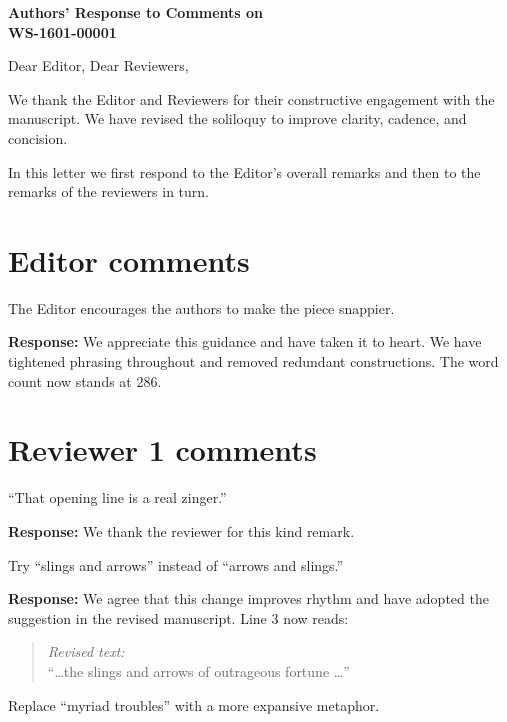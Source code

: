\documentclass[a4paper,fleqn,10pt]{article}
\newcommand{\revcom}[1]{
  \vspace{2mm}\hspace{2mm} \begin{minipage}[t]{0.96\linewidth}
    \vspace{-6mm}\begin{shaded}
      \begin{minipage}{1.0\linewidth}
        #1
      \end{minipage}
    \end{shaded}
  \end{minipage}}
\newcommand{\response}[1]{\vspace{2mm}\textbf{Response:} #1
\vspace{1mm}}
\begin{document}
\begin{center}
	\Large\bf Authors' Response to Comments on \\
	WS-1601-00001
\end{center}

Dear Editor, Dear Reviewers,

\vspace{1em}

We thank the Editor and Reviewers for their constructive engagement with the manuscript. We have revised the soliloquy
to improve clarity, cadence, and concision. 

In this letter we first respond to the Editor's overall remarks and then to the remarks of the reviewers in turn.

\section*{Editor comments}

\revcom{The Editor encourages the authors to make the piece snappier.}

\response{
	We appreciate this guidance and have taken it to heart. We have tightened phrasing
	throughout and removed redundant constructions. The word count now stands at 286.
}


\section*{Reviewer 1 comments}

\revcom{``That opening line is a real zinger.''}

\response{
	We thank the reviewer for this kind remark. 
}

\vspace{1em}

\revcom{Try ``slings and arrows'' instead of ``arrows and slings.'' }

\response{
	We agree that this change improves rhythm and have adopted
	the suggestion in the revised manuscript.  Line 3 now reads:
}

\begin{quote}
	\textit{Revised text:}\\
	``\dots the slings and arrows of outrageous fortune \dots''
\end{quote}

\vspace{1em}

\revcom{Replace ``myriad troubles'' with a more expansive metaphor.}
\end{document}
